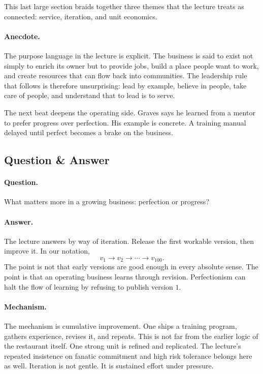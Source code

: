 This last large section braids together three themes that the lecture treats as connected: service, iteration, and unit economics.

\paragraph{Anecdote.}
The purpose language in the lecture is explicit. The business is said to exist not simply to enrich its owner but to provide jobs, build a place people want to work, and create resources that can flow back into communities. The leadership rule that follows is therefore unsurprising: lead by example, believe in people, take care of people, and understand that to lead is to serve.

The next beat deepens the operating side. Graves says he learned from a mentor to prefer progress over perfection. His example is concrete. A training manual delayed until perfect becomes a brake on the business.

\subsection{Question \& Answer}

\paragraph{Question.}
What matters more in a growing business: perfection or progress?

\paragraph{Answer.}
The lecture answers by way of iteration. Release the first workable version, then improve it. In our notation,
\begin{equation}
v_1 \longrightarrow v_2 \longrightarrow \cdots \longrightarrow v_{100}.
\end{equation}
The point is not that early versions are good enough in every absolute sense. The point is that an operating business learns through revision. Perfectionism can halt the flow of learning by refusing to publish version \(1\).

\paragraph{Mechanism.}
The mechanism is cumulative improvement. One ships a training program, gathers experience, revises it, and repeats. This is not far from the earlier logic of the restaurant itself. One strong unit is refined and replicated. The lecture's repeated insistence on fanatic commitment and high risk tolerance belongs here as well. Iteration is not gentle. It is sustained effort under pressure.

